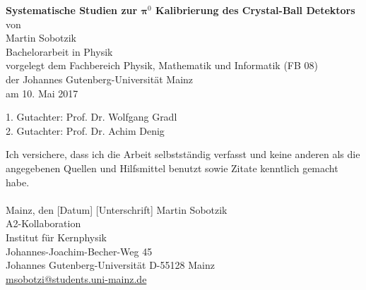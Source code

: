 \documentclass[a4paper,11pt,oneside,final,german,openbib,pdftex]{scrbook}
\begin{document}

\begin{titlepage}
  \vspace*{6mm}
  \begin{center}
     {\huge \bfseries Systematische Studien zur 
     	$
     										\bm{\pi}^0
     	$ 
     	Kalibrierung des Crystal-Ball Detektors}
     \\[3.5cm]
     {\large von}
     \\[3.5cm]
     {\dfont Martin Sobotzik}
     \\[2cm]
     {\large Bachelorarbeit in Physik \\
        vorgelegt dem Fachbereich Physik, Mathematik und Informatik (FB 08) \/\\
        der Johannes Gutenberg-Universit\"at Mainz \/\\
        am 10. Mai 2017}
   \end{center}
   \vfill
   1. Gutachter: Prof. Dr. Wolfgang Gradl\\	
   2. Gutachter: Prof. Dr. Achim Denig \\
   \vfill
\end{titlepage}

\thispagestyle{empty}
Ich versichere, dass ich die Arbeit selbstst\"andig verfasst und keine 
anderen als die angegebenen Quellen und Hilfsmittel benutzt sowie 
Zitate kenntlich gemacht habe.
\\
\\[3.5cm] 
Mainz, den [Datum] [Unterschrift]
\vfill
\noindent 
Martin Sobotzik\\
A2-Kollaboration\\
Institut f\"ur Kernphysik\\
Johannes-Joachim-Becher-Weg 45\\
Johannes Gutenberg-Universit\"at
D-55128 Mainz\\
{\url{ msobotzi@students.uni-mainz.de}}



\renewcommand\contentsname{Inhaltsverzeichnis}
\renewcommand\figurename{Abbildung}
\renewcommand\tablename{Tabelle}
\tableofcontents
\clearpage
\end{document}
